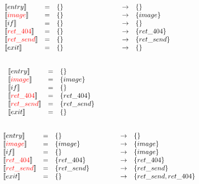 \begin{frame}
\[
\begin{array}{lclcl}
  \constraint{entry} & = & \{\} & \rightarrow & \{\}\\
  \assignconstraint{image} & = & \{\} & \rightarrow &\{image\}\\
  \constraint{if} & = & \{\} & \rightarrow &\{\}\\
  \assignconstraint{ret\_404} & = & \{\} & \rightarrow &\{ret\_404\}\\
  \assignconstraint{ret\_send} & = & \{\} & \rightarrow &\{ret\_send\}\\
  \constraint{exit} & = & \{\} & \rightarrow & \{\}\\
  && \phantom{\{command, param\}} && \phantom{\{command, param\}}
\end{array}
\]
\end{frame}

\begin{frame}
\[
\begin{array}{lclcl}
  \constraint{entry} & = & \{\} &&\\
  \assignconstraint{image} & = & \{image\} &&\\
  \constraint{if} & = & \{\} &&\\
  \assignconstraint{ret\_404} & = & \{ret\_404\} &&\\
  \assignconstraint{ret\_send} & = & \{ret\_send\} &&\\
  \constraint{exit} & = & \{\} &&\\
  && \phantom{\{command, param\}} && \phantom{\{command, param\}}
\end{array}
\]
\end{frame}

\begin{frame}
\[
\begin{array}{lclcl}
  \constraint{entry} & = & \{\} & \rightarrow & \{\}\\
  \assignconstraint{image} & = & \{image\} & \rightarrow &\{image\}\\
  \constraint{if} & = & \{\} & \rightarrow &\{image\}\\
  \assignconstraint{ret\_404} & = & \{ret\_404\} & \rightarrow &\{ret\_404\}\\
  \assignconstraint{ret\_send} & = & \{ret\_send\} & \rightarrow &\{ret\_send\}\\
  \constraint{exit} & = & \{\} & \rightarrow & \{ret\_send, ret\_404\}\\
  && \phantom{\{command, param\}} && \phantom{\{command, param\}}
\end{array}
\]
\end{frame}

